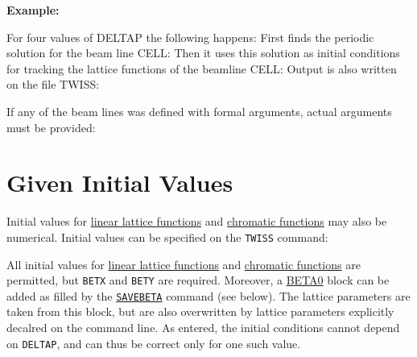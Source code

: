 \textbf{Example:} 

For four values of DELTAP the following happens: First \madx finds the
periodic solution for the beam line CELL: Then it uses this solution as
initial conditions for tracking the lattice functions of the beamline
CELL: Output is also written on the file TWISS:  

If any of the beam lines was defined with formal arguments, actual
arguments must be provided:  

\section{Given Initial Values}

Initial values for \hyperref[subsec:tables-linear]{linear
lattice functions} and \hyperref[subsec:tables-chrom]{chromatic
  functions} may also be numerical.
Initial values can be specified on the \texttt{TWISS} command:  

All initial values for
\hyperref[subsec:tables-linear]{linear lattice functions} and
\hyperref[subsec:tables-chrom]{chromatic functions} are
permitted, but \texttt{BETX} and \texttt{BETY} are required.
Moreover, a \hyperref[sec:beta0]{BETA0} block can be added as filled by the
\hyperref[sec:savebeta]{\texttt{SAVEBETA}} command (see below).
The lattice parameters are taken from this block, but are also
overwritten by lattice parameters explicitly decalred on the command 
line. As entered, the initial conditions cannot depend on
\texttt{DELTAP},
and can thus be correct only for one such value.  

